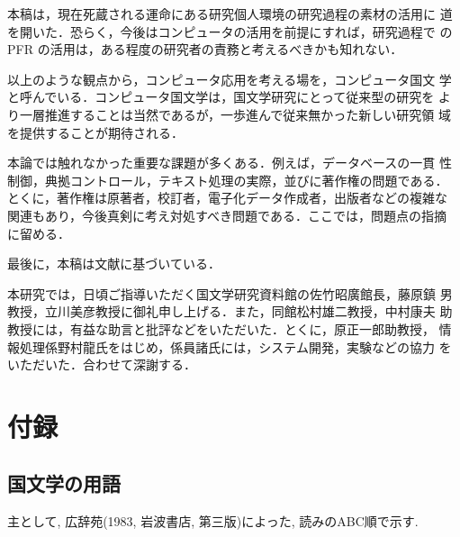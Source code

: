 本稿は，現在死蔵される運命にある研究個人環境の研究過程の素材の活用に
道を開いた．恐らく，今後はコンピュータの活用を前提にすれば，研究過程で
のPFR の活用は，ある程度の研究者の責務と考えるべきかも知れない．

以上のような観点から，コンピュータ応用を考える場を，コンピュータ国文
学と呼んでいる．コンピュータ国文学は，国文学研究にとって従来型の研究を
より一層推進することは当然であるが，一歩進んで従来無かった新しい研究領
域を提供することが期待される．

本論では触れなかった重要な課題が多くある．例えば，データベースの一貫
性制御，典拠コントロール，テキスト処理の実際，並びに著作権の問題である．
とくに，著作権は原著者，校訂者，電子化データ作成者，出版者などの複雑な
関連もあり，今後真剣に考え対処すべき問題である．ここでは，問題点の指摘
に留める．

最後に，本稿は文献\cite{Yasunaga1995a}に基づいている．


\acknowledgment

本研究では，日頃ご指導いただく国文学研究資料館の佐竹昭廣館長，藤原鎮
男教授，立川美彦教授に御礼申し上げる．また，同館松村雄二教授，中村康夫
助教授には，有益な助言と批評などをいただいた．とくに，原正一郎助教授，
情報処理係野村龍氏をはじめ，係員諸氏には，システム開発，実験などの協力
をいただいた．合わせて深謝する．






\section*{付録}

\subsection*{国文学の用語}
主として, 広辞苑(1983, 岩波書店, 第三版)によった, 読みのABC順で示す. 

